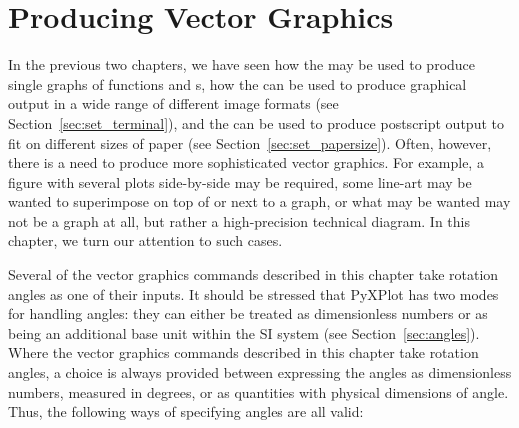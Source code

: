 %
%
%
%
%



\chapter{Producing Vector Graphics}
\label{ch:vector_graphics}

In the previous two chapters, we have seen how the  may be used to
produce single graphs of functions and \datafile s, how the  can be used to produce graphical output in a wide range of different
image formats (see Section~\ref{sec:set_terminal}), and the  can be used to produce postscript output to fit on different sizes
of paper (see Section~\ref{sec:set_papersize}). Often, however, there is a need
to produce more sophisticated vector graphics.  For example, a figure with
several plots side-by-side may be required, some line-art may be wanted to
superimpose on top of or next to a graph, or what may be wanted may not be a
graph at all, but rather a high-precision technical diagram. In this chapter,
we turn our attention to such cases.

Several of the vector graphics commands described in this chapter take rotation
angles as one of their inputs.  It should be stressed that PyXPlot has two
modes for handling angles: they can either be treated as dimensionless numbers
or as being an additional base unit within the SI system (see
Section~\ref{sec:angles}).  Where the vector graphics commands described in
this chapter take rotation angles, a choice is always provided between
expressing the angles as dimensionless numbers, measured in degrees, or as
quantities with physical dimensions of angle. Thus, the following ways of
specifying angles are all valid:

